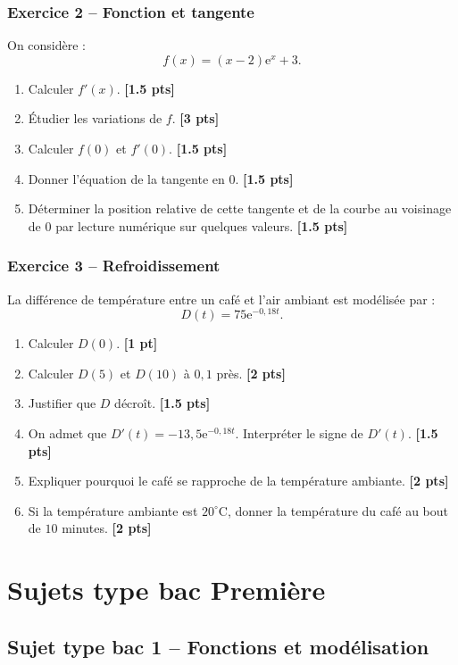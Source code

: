 \documentclass[11pt,a4paper]{article}
\newcommand{\e}{\mathrm{e}}
\newcommand{\pts}[1]{\hfill \textbf{[#1 pt]}}
\newcommand{\ptss}[1]{\hfill \textbf{[#1 pts]}}
\begin{document}
\subsubsection*{Exercice 2 -- Fonction et tangente}

On considère :
\[
f(x)=(x-2)\e^x+3.
\]
\begin{enumerate}
    \item Calculer $f'(x)$. \ptss{1.5}
    \item Étudier les variations de $f$. \ptss{3}
    \item Calculer $f(0)$ et $f'(0)$. \ptss{1.5}
    \item Donner l'équation de la tangente en $0$. \ptss{1.5}
    \item Déterminer la position relative de cette tangente et de la courbe au voisinage de $0$ par lecture numérique sur quelques valeurs. \ptss{1.5}
\end{enumerate}

\subsubsection*{Exercice 3 -- Refroidissement}

La différence de température entre un café et l'air ambiant est modélisée par :
\[
D(t)=75\e^{-0,18t}.
\]
\begin{enumerate}
    \item Calculer $D(0)$. \pts{1}
    \item Calculer $D(5)$ et $D(10)$ à $0,1$ près. \ptss{2}
    \item Justifier que $D$ décroît. \ptss{1.5}
    \item On admet que $D'(t)=-13,5\e^{-0,18t}$. Interpréter le signe de $D'(t)$. \ptss{1.5}
    \item Expliquer pourquoi le café se rapproche de la température ambiante. \ptss{2}
    \item Si la température ambiante est $20^\circ$C, donner la température du café au bout de $10$ minutes. \ptss{2}
\end{enumerate}

\newpage

\section{Sujets type bac Première}

\subsection*{Sujet type bac 1 -- Fonctions et modélisation}
\end{document}
